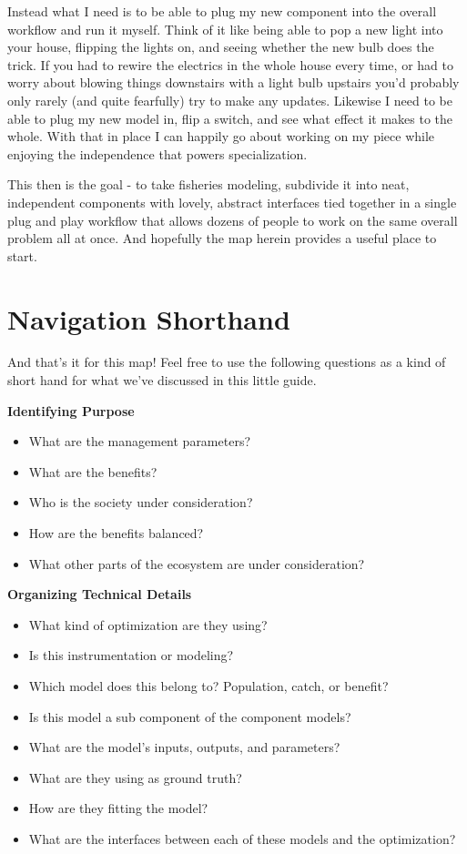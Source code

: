 \documentclass[11pt,a5paper]{book}
\begin{document}
Instead what I need is to be able to plug my new component into the overall workflow and run it myself. Think of it like being able to pop a new light into your house, flipping the lights on, and seeing whether the new bulb does the trick. If you had to rewire the electrics in the whole house every time, or had to worry about blowing things downstairs with a light bulb upstairs you'd probably only rarely (and quite fearfully) try to make any updates. Likewise I need to be able to plug my new model in, flip a switch, and see what effect it makes to the whole. With that in place I can happily go about working on my piece while enjoying the independence that powers specialization.
\newline

This then is the goal - to take fisheries modeling, subdivide it into neat, independent components with lovely, abstract interfaces tied together in a single plug and play workflow that allows dozens of people to work on the same overall problem all at once. And hopefully the map herein provides a useful place to start. 

\chapter{Navigation Shorthand}

And that's it for this map! Feel free to use the following questions as a kind of short hand for what we've discussed in this little guide.
\newline

\noindent \textbf{Identifying Purpose}

\begin{itemize}
\item What are the management parameters?
\item What are the benefits?
\item Who is the society under consideration?
\item How are the benefits balanced?
\item What other parts of the ecosystem are under consideration?
\end{itemize}

\noindent \textbf{Organizing Technical Details}

\begin{itemize}
\item What kind of optimization are they using?
\item Is this instrumentation or modeling?
\item Which model does this belong to? Population, catch, or benefit?
\item Is this model a sub component of the component models? 
\item What are the model's inputs, outputs, and parameters?
\item What are they using as ground truth?
\item How are they fitting the model?
\item What are the interfaces between each of these models and the optimization?
\end{itemize}
\end{document}
